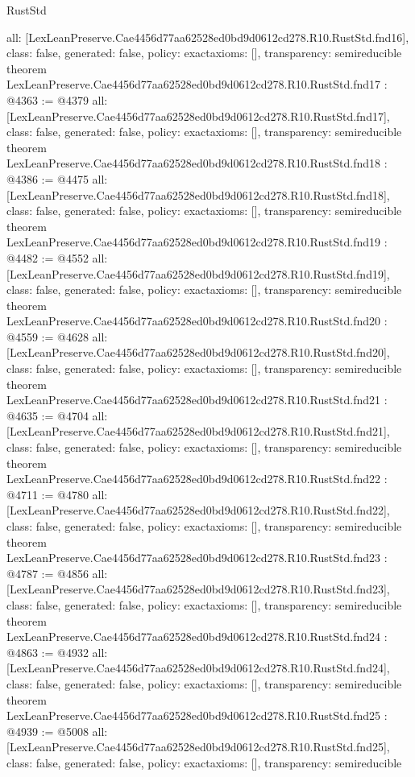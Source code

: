 \begin{lexlean}{RustStd}
\begin{coremodule}
{  all: [LexLeanPreserve.Cae4456d77aa62528ed0bd9d0612cd278.R10.RustStd.fnd16],
  class: false,
  generated: false,
  policy: exact{axioms: []},
  transparency: semireducible
}
theorem LexLeanPreserve.Cae4456d77aa62528ed0bd9d0612cd278.R10.RustStd.fnd17 : @4363 := @4379 {
  all: [LexLeanPreserve.Cae4456d77aa62528ed0bd9d0612cd278.R10.RustStd.fnd17],
  class: false,
  generated: false,
  policy: exact{axioms: []},
  transparency: semireducible
}
theorem LexLeanPreserve.Cae4456d77aa62528ed0bd9d0612cd278.R10.RustStd.fnd18 : @4386 := @4475 {
  all: [LexLeanPreserve.Cae4456d77aa62528ed0bd9d0612cd278.R10.RustStd.fnd18],
  class: false,
  generated: false,
  policy: exact{axioms: []},
  transparency: semireducible
}
theorem LexLeanPreserve.Cae4456d77aa62528ed0bd9d0612cd278.R10.RustStd.fnd19 : @4482 := @4552 {
  all: [LexLeanPreserve.Cae4456d77aa62528ed0bd9d0612cd278.R10.RustStd.fnd19],
  class: false,
  generated: false,
  policy: exact{axioms: []},
  transparency: semireducible
}
theorem LexLeanPreserve.Cae4456d77aa62528ed0bd9d0612cd278.R10.RustStd.fnd20 : @4559 := @4628 {
  all: [LexLeanPreserve.Cae4456d77aa62528ed0bd9d0612cd278.R10.RustStd.fnd20],
  class: false,
  generated: false,
  policy: exact{axioms: []},
  transparency: semireducible
}
theorem LexLeanPreserve.Cae4456d77aa62528ed0bd9d0612cd278.R10.RustStd.fnd21 : @4635 := @4704 {
  all: [LexLeanPreserve.Cae4456d77aa62528ed0bd9d0612cd278.R10.RustStd.fnd21],
  class: false,
  generated: false,
  policy: exact{axioms: []},
  transparency: semireducible
}
theorem LexLeanPreserve.Cae4456d77aa62528ed0bd9d0612cd278.R10.RustStd.fnd22 : @4711 := @4780 {
  all: [LexLeanPreserve.Cae4456d77aa62528ed0bd9d0612cd278.R10.RustStd.fnd22],
  class: false,
  generated: false,
  policy: exact{axioms: []},
  transparency: semireducible
}
theorem LexLeanPreserve.Cae4456d77aa62528ed0bd9d0612cd278.R10.RustStd.fnd23 : @4787 := @4856 {
  all: [LexLeanPreserve.Cae4456d77aa62528ed0bd9d0612cd278.R10.RustStd.fnd23],
  class: false,
  generated: false,
  policy: exact{axioms: []},
  transparency: semireducible
}
theorem LexLeanPreserve.Cae4456d77aa62528ed0bd9d0612cd278.R10.RustStd.fnd24 : @4863 := @4932 {
  all: [LexLeanPreserve.Cae4456d77aa62528ed0bd9d0612cd278.R10.RustStd.fnd24],
  class: false,
  generated: false,
  policy: exact{axioms: []},
  transparency: semireducible
}
theorem LexLeanPreserve.Cae4456d77aa62528ed0bd9d0612cd278.R10.RustStd.fnd25 : @4939 := @5008 {
  all: [LexLeanPreserve.Cae4456d77aa62528ed0bd9d0612cd278.R10.RustStd.fnd25],
  class: false,
  generated: false,
  policy: exact{axioms: []},
  transparency: semireducible
}
\end{coremodule}
\end{lexlean}
